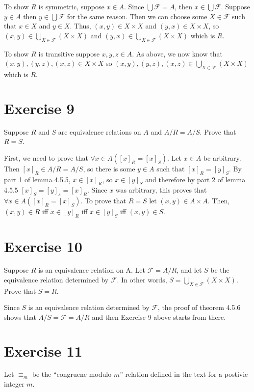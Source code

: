 \documentclass[11pt]{article}
\newcommand{\family}[1]{\mathcal{#1}}
\begin{document}
To show $R$ is symmetric, suppose $x \in A$. Since $\bigcup \family{F} = A$,
then $x \in \bigcup \family{F}$. Suppose $y \in A$ then $y \in \bigcup \family{F}$
for the same reason. Then we can choose some $X \in \family{F}$ such that 
$x \in X$ and $y \in X$. Thus, $(x,y) \in X \times X$ and $(y,x) \in X \times X$,
so $(x,y) \in \bigcup_{X \in \family{F}} (X \times X)$ and $(y,x) \in \bigcup_{X \in \family{F}} (X \times X)$
which is $R$.

To show $R$ is transitive suppose $x,y,z \in A$. As above, we now know that 
$(x,y), (y,z), (x,z) \in X \times X$ so 
$(x,y), (y,z), (x,z) \in \bigcup_{X \in \family{F}} (X \times X)$ which is $R$.

\section{Exercise 9}

Suppose $R$ and $S$ are equivalence relations on $A$ and $A/R = A/S$. Prove that 
$R=S$.

First, we need to prove that $\forall x \in A ([x]_R = [x]_S)$. Let $x \in A$ be
arbitrary. Then $[x]_R \in A/R = A/S$, so there is some $y \in A$ such that 
$[x]_R = [y]_S$. By part 1 of lemma 4.5.5, $x \in [x]_R$, so $x \in [y]_S$
and therefore by part 2 of lemma 4.5.5 $[x]_S = [y]_s = [x]_R$. Since $x$ was 
arbitrary, this proves that $\forall x \in A ([x]_R = [x]_S)$. To prove that 
$R=S$ let $(x,y) \in A \times A$. Then, $(x,y) \in R$ iff $x \in [y]_R$ iff 
$x \in [y]_S$ iff $(x,y) \in S$.

\section*{Exercise 10}

Suppose $R$ is an equivalence relation on A. Let $\family{F} = A/R$, and let 
$S$ be the equivalence relation determined by $\family{F}$. In other words,
$S = \bigcup_{X \in \family{F}} (X \times X)$. Prove that $S=R$.

Since $S$ is an equivalence relation determined by $\family{F}$, the proof 
of theorem 4.5.6 shows that $A/S = \family{F} = A/R$ and then Exercise 9 above 
starts from there.

\section*{Exercise 11}

Let $\equiv_m$ be the ``congruene modulo $m$'' relation defined in the text for 
a postivie integer $m$.
\end{document}
